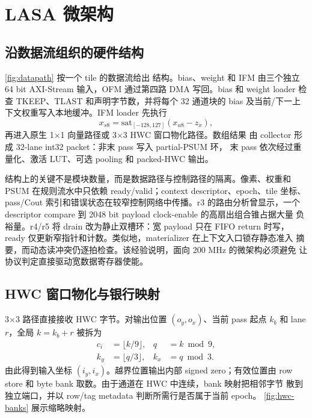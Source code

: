 \section{LASA 微架构}
\label{sec:microarch}

\subsection{沿数据流组织的硬件结构}

\cref{fig:datapath} 按一个 tile 的数据流给出 \LASA 结构。bias、weight 和
IFM 由三个独立 64 bit AXI-Stream 输入，OFM 通过第四路 DMA 写回。bias 和
weight loader 检查 TKEEP、TLAST 和声明字节数，并将每个 32 通道块的 bias
及当前/下一上下文权重写入本地缓冲。IFM loader 先执行
\begin{equation}
x_{s8}=\mathrm{sat}_{[-128,127]}(x_{u8}-z_x),
\end{equation}
再进入原生 1$\times$1 向量路径或 3$\times$3 HWC 窗口物化路径。数组结果
由 collector 形成 32-lane int32 packet：非末 pass 写入 partial-PSUM 环，
末 pass 依次经过重量化、激活 LUT、可选 pooling 和 packed-HWC 输出。



结构上的关键不是模块数量，而是数据路径与控制路径的隔离。像素、权重和
PSUM 在规则流水中只依赖 ready/valid；context descriptor、epoch、tile 坐标、
pass/Cout 索引和错误状态在较窄控制网络中传播。r3 的路由分析曾显示，一个
descriptor compare 到 2048 bit payload clock-enable 的高扇出组合锥占据大量
负裕量。r4/r5 将 drain 改为静止双槽环：宽 payload 只在 FIFO return 时写，
ready 仅更新窄指针和计数。类似地，materializer 在上下文入口锁存静态准入
摘要，而动态读冲突仍逐拍检查。该经验说明，面向 200 MHz 的微架构必须避免
让协议判定直接驱动宽数据寄存器使能。

\subsection{HWC 窗口物化与银行映射}

3$\times$3 路径直接接收 HWC 字节。对输出位置 $(o_y,o_x)$、当前 pass 起点
$k_b$ 和 lane $r$，全局 $k=k_b+r$ 被拆为
\begin{equation}
\begin{aligned}
c_i&=\lfloor k/9\rfloor, & q&=k\bmod 9, \\
k_y&=\lfloor q/3\rfloor, & k_x&=q\bmod3.
\end{aligned}
\end{equation}
由此得到输入坐标 $(i_y,i_x)$。越界位置输出内部 signed zero；有效位置由
row store 和 byte bank 取数。由于通道在 HWC 中连续，bank 映射把相邻字节
散到独立端口，并以 row/tag metadata 判断所需行是否属于当前 epoch。
\cref{fig:hwc-banks} 展示缩略映射。

